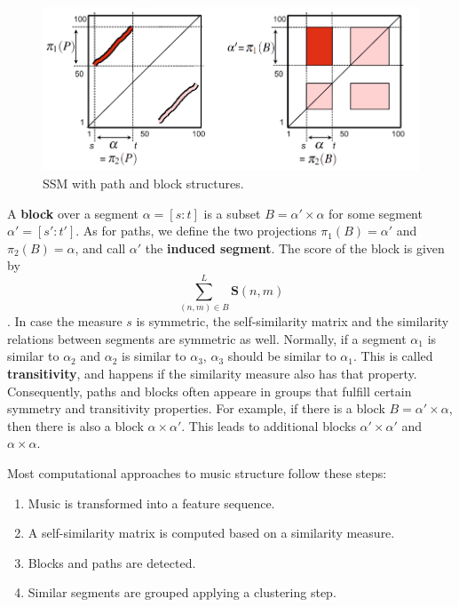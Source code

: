 \documentclass[a4paper, 9pt, twocolumn]{extarticle}
\begin{document}
\begin{figure}[h]
\centering
\includegraphics[width=\linewidth]{images/SSMpathBlocks.png}
\caption{SSM with path and block structures.}
\label{fig:ssmPathBlock}
\end{figure}

A \textbf{block} over a segment  $\alpha=[s:t]$ is a subset $B=\alpha' \times \alpha$ for some segment $\alpha'=[s':t']$. As for paths, we define the two projections $\pi_{1}(B)= \alpha'$ and $\pi_{2}(B)= \alpha$, and call $\alpha'$ the \textbf{induced segment}. The score of the block is given by \[\sum_{(n,m)\in B}^{L}\textbf{S}(n, m)\].
In case the  measure $s$ is symmetric, the self-similarity matrix and the similarity relations between segments are symmetric as well. Normally, if a segment $\alpha_{1}$ is similar to $\alpha_{2}$ and $\alpha_{2}$ is similar to $\alpha_{3}$, $\alpha_{3}$ should be similar to $\alpha_{1}$. This is called \textbf{transitivity}, and happens if the similarity measure also has that property. Consequently, paths and blocks often appeare in groups that fulfill certain symmetry and transitivity properties. For example, if there is a block $B=\alpha'\times\alpha$, then there is also a block $\alpha\times\alpha'$. This leads to additional blocks $\alpha'\times\alpha'$ and $\alpha\times\alpha$. 

Most computational approaches to music structure follow these steps:

\begin{enumerate}
\item Music is transformed into a feature sequence.\item A self-similarity matrix is computed based on a similarity measure.\item Blocks and paths are detected.\item Similar segments are grouped applying a clustering step.
\end{enumerate}
\end{document}
